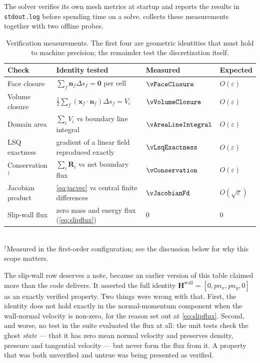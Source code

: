 The solver verifies its own mesh metrics at startup and reports the results in
\texttt{stdout.log} before spending time on a solve.
 collects these measurements together with two offline
probes.

\begin{table}[htbp]
  \centering
  \caption{Verification measurements. The first four are geometric identities
  that must hold to machine precision; the remainder test the discretization
  itself.}
  \label{tab:verification}
  \small
  \begin{tabular}{llll}
    \toprule
    Check & Identity tested & Measured & Expected \\
    \midrule
    Face closure & $\sum_f \mathbf{n}_f\Delta s_f=\mathbf{0}$ per cell
      & $\vFaceClosure$ & $O(\varepsilon)$ \\
    Volume closure & $\tfrac12\sum_f (\mathbf{x}_f\!\cdot\!\mathbf{n}_f)\Delta s_f=V_i$
      & $\vVolumeClosure$ & $O(\varepsilon)$ \\
    Domain area & $\sum_i V_i$ vs boundary line integral
      & $\vAreaLineIntegral$ & $O(\varepsilon)$ \\
    LSQ exactness & gradient of a linear field reproduced exactly
      & $\vLsqExactness$ & $O(\varepsilon)$ \\
    Conservation$^\dagger$ & $\sum_i \mathbf{R}_i$ vs net boundary flux
      & $\vConservation$ & $O(\varepsilon)$ \\
    Jacobian product & \cref{eq:jacvec} vs central finite differences
      & $\vJacobianFd$ & $O(\sqrt{\varepsilon})$ \\
    Slip-wall flux & zero mass and energy flux (\cref{eq:slipflux})
      & $0$ & $0$ \\
    \bottomrule
  \end{tabular}
  \\[2pt]
  \footnotesize $^\dagger$Measured in the first-order configuration; see the
  discussion below for why this scope matters.
\end{table}

The slip-wall row deserves a note, because an earlier version of this table claimed more
than the code delivers. It asserted the full identity
$\mathbf{H}^{\mathrm{wall}}=[0,pn_x,pn_y,0]$ as an exactly verified property. Two things
were wrong with that. First, the identity does not hold exactly in the normal-momentum
component when the wall-normal velocity is non-zero, for the reason set out at
\cref{eq:slipflux}. Second, and worse, no test in the suite evaluated the flux at all:
the unit tests check the ghost \emph{state} --- that it has zero mean normal velocity and
preserves density, pressure and tangential velocity --- but never form the flux from it.
A property that was both unverified and untrue was being presented as verified.

